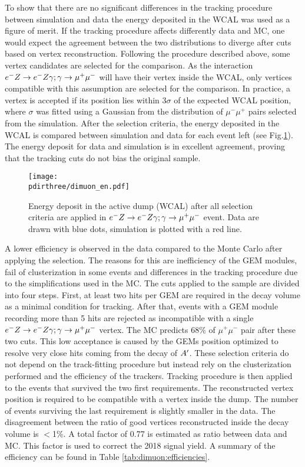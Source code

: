 To show that there are no significant differences in the tracking procedure between simulation and data the energy deposited in the WCAL was used as a figure of merit. If the tracking procedure affects differently data and MC, one would expect the agreement between the two distributions to diverge after cuts based on vertex reconstruction. Following the procedure described above, some vertex candidates are selected for the comparison. As the interaction $\emu$ will have their vertex inside the WCAL, only vertices compatible with this assumption are selected for the comparison. In practice, a vertex is accepted if its position lies within 3$\sigma$ of the expected WCAL position, where $\sigma$ was fitted using a Gaussian from the distribution of $\mu^- \mu^+$ pairs selected from the simulation. After the selection criteria, the energy deposited in the WCAL is compared between simulation and data for each event left (see Fig.\ref{fig:dimuon_en}). The energy deposit for data and simulation is in excellent agreement, proving that the tracking cuts do not bias the original sample.

\begin{figure}[tbh!]
  \begin{center}
    \texttt{[image: \\pdirthree/dimuon\_en.pdf]}
  \end{center}
  \caption[$\emu$ MC-DATA comparison in visible mode]{Energy deposit in the active dump (WCAL) after all selection criteria are applied in $\emu$ event. Data are drawn with blue dots, simulation is plotted with a red line.}
  \label{fig:dimuon_en}
\end{figure}

A lower efficiency is observed in the data compared to the Monte Carlo after applying the selection. The reasons for this are inefficiency of the GEM modules, fail of clusterization in some events and differences in the tracking procedure due to the simplifications used in the MC. The cuts applied to the sample are divided into four steps. First, at least two hits per GEM are required in the decay volume as a minimal condition for tracking. After that, events with a GEM module recording more than 5 hits are rejected as incompatible with a single $\emu$ vertex. The MC predicts 68\% of $\mu^+ \mu^-$ pair after these two cuts. This low acceptance is caused by the GEMs position optimized to resolve very close hits coming from the decay of $A'$. These selection criteria do not depend on the track-fitting procedure but instead rely on the clusterization performed and the efficiency of the trackers. Tracking procedure is then applied to the events that survived the two first requirements. The reconstructed vertex position is required to be compatible with a vertex inside the dump. The number of events surviving the last requirement  is slightly smaller in the data. The disagreement between the ratio of good vertices reconstructed inside the decay volume is $<$1\%. A total factor of 0.77 is estimated as ratio between data and MC. This factor is used to correct the 2018 signal yield. A summary of the efficiency can be found in Table \ref{tab:dimuon:efficiencies}.

